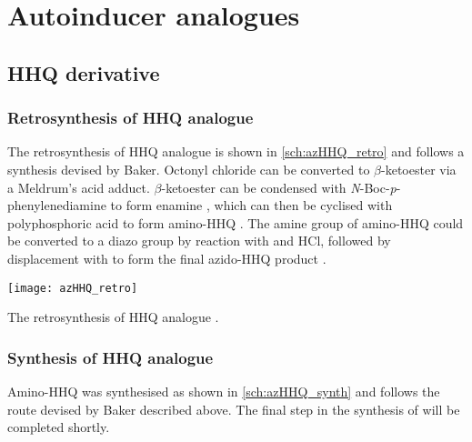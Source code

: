 \section{Autoinducer analogues}

\subsection{HHQ derivative}

\subsubsection{Retrosynthesis of HHQ analogue }

The retrosynthesis of HHQ analogue  is shown in \ref{sch:azHHQ_retro} and follows a synthesis devised by Baker\cite{Baker2014}. Octonyl chloride  can be converted to $\beta$-ketoester  via a Meldrum's acid adduct. $\beta$-ketoester  can be condensed with \textit{N}-Boc-\textit{p}-phenylenediamine  to form enamine , which can then be cyclised with polyphosphoric acid to form amino-HHQ . The amine group of amino-HHQ  could be converted to a diazo group by reaction with  and HCl, followed by displacement with  to form the final azido-HHQ product \cite{Xu2013}.

\begin{scheme}[H]
	\begin{center}
		\texttt{[image: azHHQ\_retro]}
		\caption{The retrosynthesis of HHQ analogue . 	
		\label{sch:azHHQ_retro}}
	\end{center}
\end{scheme}

\subsubsection{Synthesis of HHQ analogue  \label{sec:azHHQ}}

Amino-HHQ  was synthesised as shown in \ref{sch:azHHQ_synth} and follows the route devised by Baker\cite{Baker2014} described above.
The final step in the synthesis of  will be completed shortly.

